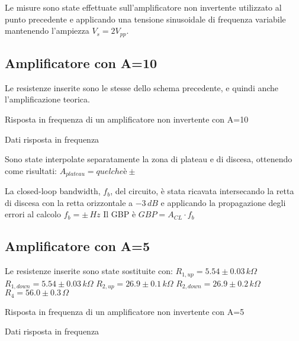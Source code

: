 Le misure sono state effettuate sull'amplificatore non invertente utilizzato al punto precedente e applicando una tensione sinusoidale 
di frequenza variabile mantenendo l'ampiezza $V_s= 2 V_{pp}$.

\subsection{Amplificatore con A=10}
Le resistenze inserite sono le stesse dello schema precedente, e quindi anche l'amplificazione teorica.

\begin{grafico}
 \centering 
  
 \caption{Risposta in frequenza di un amplificatore non invertente con A=10} 
 \label{gr:amp_noninv_A10.tex} 
\end{grafico}

\begin{tabella}
 \centering
  
 \caption{Dati risposta in frequenza}
 \label{tab:tab_noninv_A10.tex}
\end{tabella}

Sono state interpolate separatamente la zona di plateau e di discesa, ottenendo come risultati:
$A_{plateau}=quel che è \pm$

La closed-loop bandwidth, $f_b$, del circuito, è stata ricavata intersecando la retta di discesa con la retta orizzontale a 
$-3 \,dB$ e applicando la propagazione degli errori al calcolo %
$f_b= \pm \,Hz $
Il GBP è
$GBP=A_{CL} \cdot f_b $

\subsection{Amplificatore con A=5}
Le resistenze inserite sono state sostituite con:
$R_{1,up}=5.54 \pm 0.03\,k\Omega $%
$R_{1,down}=5.54 \pm 0.03\,k\Omega$ %
$R_{2,up}=26.9 \pm 0.1\,k\Omega$ %
$R_{2,down}=26.9 \pm 0.2 \,k\Omega$
$R_4=56.0 \pm 0.3\,\Omega$

\begin{grafico}
 \centering 
  
 \caption{Risposta in frequenza di un amplificatore non invertente con A=5} 
 \label{gr:amp_noninv_A5.tex} 
\end{grafico}

\begin{tabella}
 \centering
   
 \caption{Dati risposta in frequenza}
 \label{tab:tab_noninv_A5.tex}
\end{tabella}

